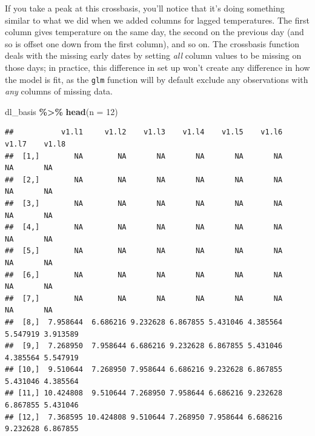 \documentclass[
]{book}
\newenvironment{Shaded}{\begin{snugshade}}{\end{snugshade}}
\newcommand{\AttributeTok}[1]{\textcolor[rgb]{0.13,0.29,0.53}{#1}}
\newcommand{\DecValTok}[1]{\textcolor[rgb]{0.00,0.00,0.81}{#1}}
\newcommand{\FunctionTok}[1]{\textcolor[rgb]{0.13,0.29,0.53}{\textbf{#1}}}
\newcommand{\NormalTok}[1]{#1}
\newcommand{\OtherTok}[1]{\textcolor[rgb]{0.56,0.35,0.01}{#1}}
\newcommand{\SpecialCharTok}[1]{\textcolor[rgb]{0.81,0.36,0.00}{\textbf{#1}}}
\newcommand{\StringTok}[1]{\textcolor[rgb]{0.31,0.60,0.02}{#1}}
\begin{document}
\begin{Shaded}
\end{Shaded}

If you take a peak at this crossbasis, you'll notice that it's doing something similar to
what we did when we added columns for lagged temperatures. The first column gives temperature
on the same day, the second on the previous day (and so is offset one down from the first
column), and so on. The crossbasis function deals with the missing early dates by setting
\emph{all} column values to be missing on those days; in practice, this difference in set up
won't create any difference in how the model is fit, as the \texttt{glm} function will by default
exclude any observations with \emph{any} columns of missing data.

\begin{Shaded}
\begin{Highlighting}[]
\NormalTok{dl\_basis }\SpecialCharTok{\%\textgreater{}\%} 
  \FunctionTok{head}\NormalTok{(}\AttributeTok{n =} \DecValTok{12}\NormalTok{)}
\end{Highlighting}
\end{Shaded}

\begin{verbatim}
##           v1.l1     v1.l2    v1.l3    v1.l4    v1.l5    v1.l6    v1.l7    v1.l8
##  [1,]        NA        NA       NA       NA       NA       NA       NA       NA
##  [2,]        NA        NA       NA       NA       NA       NA       NA       NA
##  [3,]        NA        NA       NA       NA       NA       NA       NA       NA
##  [4,]        NA        NA       NA       NA       NA       NA       NA       NA
##  [5,]        NA        NA       NA       NA       NA       NA       NA       NA
##  [6,]        NA        NA       NA       NA       NA       NA       NA       NA
##  [7,]        NA        NA       NA       NA       NA       NA       NA       NA
##  [8,]  7.958644  6.686216 9.232628 6.867855 5.431046 4.385564 5.547919 3.913589
##  [9,]  7.268950  7.958644 6.686216 9.232628 6.867855 5.431046 4.385564 5.547919
## [10,]  9.510644  7.268950 7.958644 6.686216 9.232628 6.867855 5.431046 4.385564
## [11,] 10.424808  9.510644 7.268950 7.958644 6.686216 9.232628 6.867855 5.431046
## [12,]  7.368595 10.424808 9.510644 7.268950 7.958644 6.686216 9.232628 6.867855
\end{verbatim}
\end{document}
